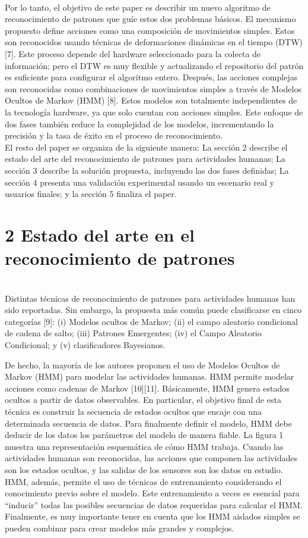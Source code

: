 \documentclass[10pt]{article}
\begin{document}
\\
Por lo tanto, el objetivo de este paper es describir un nuevo algoritmo de reconocimiento de patrones que guíe estos dos problemas básicos. El mecanismo propuesto define acciones como una composición de movimientos simples. Estos son reconocidos usando técnicas de deformaciones dinámicas en el tiempo (DTW) [7]. Este proceso depende del hardware seleccionado para la colecta de información; pero el DTW  es muy flexible y actualizando el repositorio del patrón es suficiente para configurar el algoritmo entero. Después, las acciones complejas son reconocidas como combinaciones de movimientos simples a través de Modelos Ocultos de Markov (HMM) [8]. Estos modelos son totalmente independientes de la tecnología hardware, ya que solo cuentan con acciones simples. Este enfoque de dos fases también reduce la complejidad de los modelos, incrementando la precisión y la tasa de éxito en el proceso de reconocimiento.
\\
El resto del paper se organiza de la siguiente manera: La sección 2 describe el estado del arte del reconocimiento de patrones para actividades humanas; La sección 3 describe la solución propuesta, incluyendo las dos fases definidas; La sección 4 presenta una validación experimental usando un escenario real y usuarios finales; y la sección 5 finaliza el paper.

\section{2 Estado del arte en el reconocimiento de patrones}

\\

Distintas técnicas de reconocimiento de patrones para actividades humanas han sido reportadas. Sin embargo, la propuesta más común puede clasificarse en cinco categorías [9]: (i) Modelos ocultos de Markov; (ii) el campo aleatorio condicional de cadena de salto; (iii) Patrones Emergentes; (iv) el Campo Aleatorio Condicional; y (v) clasificadores Bayesianos.

De hecho, la mayoría de los autores proponen el uso de Modelos Ocultos de Markov (HMM) para modelar las actividades humanas. HMM permite modelar acciones como cadenas de Markov [10][11]. Básicamente, HMM genera estados ocultos a partir de datos observables. En particular, el objetivo final de esta técnica es construir la secuencia de estados ocultos que encaje con una determinada secuencia de datos. Para finalmente definir el modelo, HMM debe deducir de los datos los parámetros del modelo de manera fiable. La figura 1 muestra una representación esquemática de cómo HMM trabaja. Cuando las actividades humanas son reconocidas, las acciones que componen las actividades son los estados ocultos, y las salidas de los sensores son los datos en estudio. HMM, además, permite el uso de técnicas de entrenamiento considerando el conocimiento previo sobre el modelo. Este entrenamiento a veces es esencial para “inducir” todas las posibles secuencias de datos requeridas para calcular el HMM. Finalmente, es muy importante tener en cuenta que los HMM aislados simples se pueden combinar para crear modelos más grandes y complejos.
\end{document}
